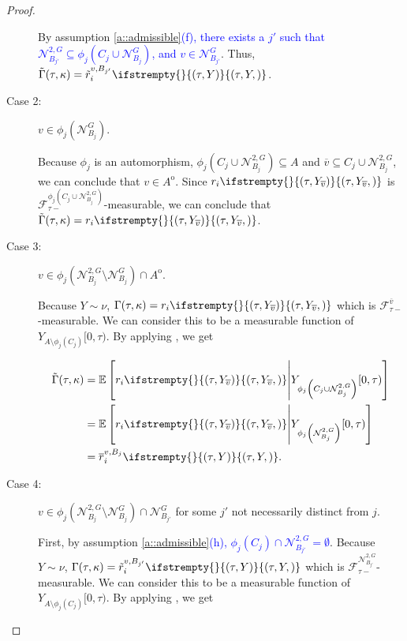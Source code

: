 \documentclass[12pt]{article}
\newcommand{\mb}{\mathbb}
\newcommand{\mc}{\mathcal}
\newcommand{\ov}{\overline}
\newcommand{\tb}{\textcolor{blue}}
\newcommand{\ex}[1]{\mb{E}\left[#1\right]}			%
\newcommand{\gneigh}[2]{\mc{N}^{#1}_{#2}}			%
\newcommand{\dgneigh}[2]{\mc{N}^{2,#1}_{#2}}		%
\newcommand{\cl}[1]{\ov{#1}}						%
\newcommand{\rate}{r}								%
\newcommand{\F}{\mc{F}}								%
\newcommand{\vind}[1]{_{#1}}						%
\newcommand{\tmi}[1]{#1}							%
\newcommand{\vpara}[1]{^{#1}}						%
\newcommand{\stpara}[1]{_{#1}}						%
\newcommand{\tpara}[1]{_{#1}}						%
\newcommand{\tmepro}[3]{
\ifstrempty{#3}{
	\left(#1,#2\right)}{
	\left(#1,#2,#3\right)}}							%
\newcommand{\Xg}{Y}									%
\newcommand{\brate}{\alt{\rate}}					%
\newcommand{\inte}[1]{{#1}^\mathrm{o}}				%
\newcommand{\alt}[1]{\tilde{#1}}					%
\newcommand{\rt}{\tau}								%
\renewcommand{\mark}{\kappa}						%
\newcommand{\ratee}{\Gamma}							%
\newcommand{\cratee}{\alt{\ratee}}					%
\newcommand{\mm}{\nu}								%
\newcommand{\bgrate}{\ov{\rate}}					%
\newcommand{\vjpara}[2]{^{#1,#2}}					%
\begin{document}
\begin{proof}
\begin{description}
By assumption \ref{a::admissible}\tb{(f), there exists a \(j'\) such that \(\dgneigh{G}{B_{j'}} \subseteq \phi_j(C_j\cup \gneigh{G}{B_j})\), and \(v \in \gneigh{G}{B_{j'}}\)}. Thus, \(\cratee(\rt,\mark) = \brate\vjpara{v}{B_{j'}}\stpara{i}\tmepro{\rt}{\Xg}{}\).

\item[Case 2: ] \(v\in \phi_j(\gneigh{G}{B_j})\). 

Because \(\phi_j\) is an automorphism, \(\phi_j\left(C_j\cup\dgneigh{G}{B_j}\right) \subseteq A\) and \(\cl{v} \subseteq C_j\cup\dgneigh{G}{B_j}\), we can conclude that \(v \in \inte{A}\). Since \(\rate\stpara{i}\tmepro{\rt}{\Xg\vind{\cl{v}}}{}\) is \(\F\vpara{\phi_j\left(C_j\cup\dgneigh{G}{B_j}\right)}\tpara{\rt-}\)-measurable, we can conclude that \(\cratee(\rt,\mark) = \rate\stpara{i}\tmepro{\rt}{\Xg\vind{\cl{v}}}{}\).

\item[Case 3: ] \(v \in \phi_j(\dgneigh{G}{B_j}\setminus\gneigh{G}{B_j})\cap\inte{A}\).

Because \(\Xg\sim\mm\), \(\ratee(\rt,\mark) = \rate\stpara{i}\tmepro{\rt}{\Xg\vind{\cl{v}}}{}\) which is \(\F\vpara{\cl{v}}\tpara{\rt-}\)-measurable. We can consider this to be a measurable function of \(\Xg\vind{A\setminus\phi_j(C_j)}\tmi{[0,\rt)}\). By applying \cite[lemma \ref{F-TL::Props}(e)]{F}, we get

\begin{align*}
\cratee(\rt,\mark) &= \ex{\rate\stpara{i}\tmepro{\rt}{\Xg\vind{\cl{v}}}{}\middle|\Xg\vind{\phi_j\left(C_j\cup\dgneigh{G}{B_j}\right)}\tmi{[0,\rt)}}\\
&= \ex{\rate\stpara{i}\tmepro{\rt}{\Xg\vind{\cl{v}}}{}\middle|\Xg\vind{\phi_j\left(\dgneigh{G}{B_j}\right)}\tmi{[0,\rt)}}\\
&= \bgrate\vjpara{v}{B_j}\stpara{i}\tmepro{\rt}{\Xg}{}.
\end{align*}

\item[Case 4: ] \(v \in \phi_j(\dgneigh{G}{B_j}\setminus\gneigh{G}{B_j})\cap \gneigh{G}{B_{j'}}\) for some \(j'\) not necessarily distinct from \(j\).

First, by assumption \ref{a::admissible}\tb{(h), \(\phi_j(C_j)\cap\dgneigh{G}{B_{j'}}= \emptyset\)}. Because \(\Xg\sim\mm\), \(\ratee(\rt,\mark) = \brate\vjpara{v}{B_{j'}}\stpara{i}\tmepro{\rt}{\Xg}{}\) which is \(\F\vpara{\dgneigh{G}{B_{j'}}}\tpara{\rt-}\)-measurable. We can consider this to be a measurable function of \(\Xg\vind{A\setminus\phi_j(C_j)}\tmi{[0,\rt)}\). By applying \cite[lemma \ref{F-TL::Props}(e)]{F}, we get


\end{description}
\end{proof}
\end{document}
